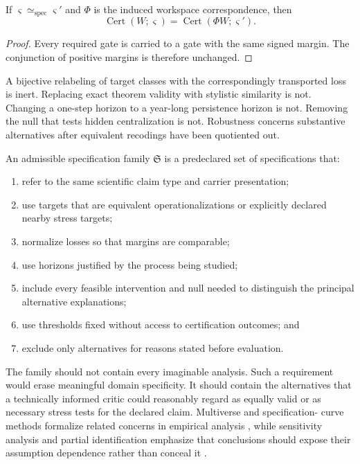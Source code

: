 \begin{SRWTproposition}
\label{SRWT:prop:spec-equivalence-invariance}
If \(\varsigma\simeq_{\mathrm{spec}}\varsigma'\) and \(\Phi\) is the induced
workspace correspondence, then
\[
\operatorname{Cert}(W;\varsigma)
=
\operatorname{Cert}(\Phi W;\varsigma').
\]
\end{SRWTproposition}

\begin{proof}
Every required gate is carried to a gate with the same signed margin. The
conjunction of positive margins is therefore unchanged.
\end{proof}

A bijective relabeling of target classes with the correspondingly transported
loss is inert. Replacing exact theorem validity with stylistic similarity is
not. Changing a one-step horizon to a year-long persistence horizon is not.
Removing the null that tests hidden centralization is not. Robustness concerns
substantive alternatives after equivalent recodings have been quotiented out.


\begin{SRWTdefinition}
\label{SRWT:def:admissible-spec-family}
An admissible specification family \(\mathfrak S\) is a predeclared set of
specifications that:
\begin{enumerate}
\item refer to the same scientific claim type and carrier presentation;
\item use targets that are equivalent operationalizations or explicitly
 declared nearby stress targets;
\item normalize losses so that margins are comparable;
\item use horizons justified by the process being studied;
\item include every feasible intervention and null needed to distinguish the
 principal alternative explanations;
\item use thresholds fixed without access to certification outcomes; and
\item exclude only alternatives for reasons stated before evaluation.
\end{enumerate}
\end{SRWTdefinition}

The family should not contain every imaginable analysis. Such a requirement
would erase meaningful domain specificity. It should contain the alternatives
that a technically informed critic could reasonably regard as equally valid or
as necessary stress tests for the declared claim. Multiverse and specification-
curve methods formalize related concerns in empirical analysis
\cite{SRWT:SteegenEtAl2016,SRWT:SimonsohnEtAl2020}, while sensitivity analysis and
partial identification emphasize that conclusions should expose their
assumption dependence rather than conceal it \cite{SRWT:Leamer1983,SRWT:Manski2003}.

